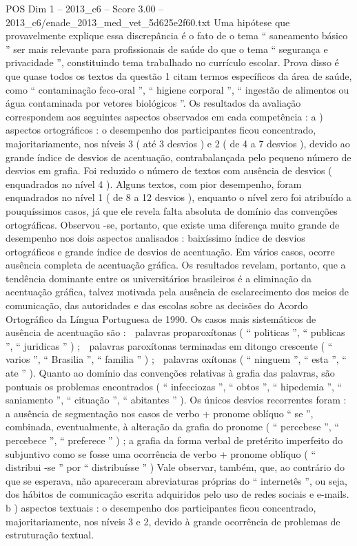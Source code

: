 \begin{textsample}{POS Dim 1 – 2013\_c6 – Score 3.00 – 2013\_c6/enade\_2013\_med\_vet\_5d625e2f60.txt}
Uma hipótese que provavelmente explique essa discrepância é o fato de o tema “ saneamento básico ” ser mais relevante para profissionais de saúde do que o tema “ segurança e privacidade ”, constituindo tema trabalhado no currículo escolar.
Prova disso é que quase todos os textos da questão 1 citam termos específicos da área de saúde, como “ contaminação feco-oral ”, “ higiene corporal ”, “ ingestão de alimentos ou água contaminada por vetores biológicos ”.
Os resultados da avaliação correspondem aos seguintes aspectos observados em cada competência : a ) aspectos ortográficos : o desempenho dos participantes ficou concentrado, majoritariamente, nos níveis 3 ( até 3 desvios ) e 2 ( de 4 a 7 desvios ), devido ao grande índice de desvios de acentuação, contrabalançada pelo pequeno número de desvios em grafia.
Foi reduzido o número de textos com ausência de desvios ( enquadrados no nível 4 ).
Alguns textos, com pior desempenho, foram enquadrados no nível 1 ( de 8 a 12 desvios ), enquanto o nível zero foi atribuído a pouquíssimos casos, já que ele revela falta absoluta de domínio das convenções ortográficas.
Observou -se, portanto, que existe uma diferença muito grande de desempenho nos dois aspectos analisados : baixíssimo índice de desvios ortográficos e grande índice de desvios de acentuação.
Em vários casos, ocorre ausência completa de acentuação gráfica.
Os resultados revelam, portanto, que a tendência dominante entre os universitários brasileiros é a eliminação da acentuação gráfica, talvez motivada pela ausência de esclarecimento dos meios de comunicação, das autoridades e das escolas sobre as decisões do Acordo Ortográfico da Língua Portuguesa de 1990.
Os casos mais sistemáticos de ausência de acentuação são :  palavras proparoxítonas ( “ politicas ”, “ publicas ”, “ juridicas ” ) ;  palavras paroxítonas terminadas em ditongo crescente ( “ varios ”, “ Brasilia ”, “ familia ” ) ;  palavras oxítonas ( “ ninguem ”, “ esta ”, “ ate ” ).
Quanto ao domínio das convenções relativas à grafia das palavras, são pontuais os problemas encontrados ( “ infecciozas ”, “ obtos ”, “ hipedemia ”, “ saniamento ”, “ cituação ”, “ abitantes ” ).
Os únicos desvios recorrentes foram : a ausência de segmentação nos casos de verbo + pronome oblíquo “ se ”, combinada, eventualmente, à alteração da grafia do pronome ( “ percebese ”, “ percebece ”, “ preferece ” ) ; a grafia da forma verbal de pretérito imperfeito do subjuntivo como se fosse uma ocorrência de verbo + pronome oblíquo ( “ distribui -se ” por “ distribuísse ” ) Vale observar, também, que, ao contrário do que se esperava, não apareceram abreviaturas próprias do “ internetês ”, ou seja, dos hábitos de comunicação escrita adquiridos pelo uso de redes sociais e e-mails. b ) aspectos textuais : o desempenho dos participantes ficou concentrado, majoritariamente, nos níveis 3 e 2, devido à grande ocorrência de problemas de estruturação textual.

\end{textsample}
